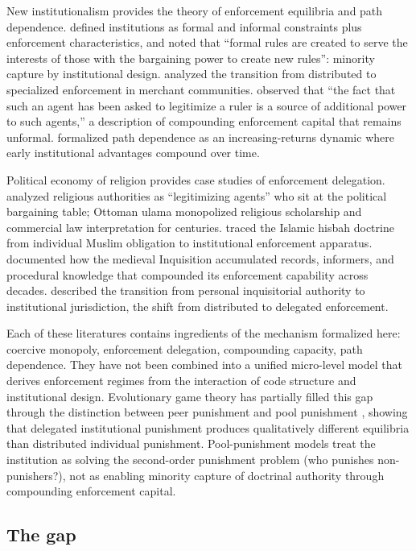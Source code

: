 \documentclass[12pt]{article}
\begin{document}
New institutionalism provides the theory of enforcement equilibria and path dependence. \citet{north1990} defined institutions as formal and informal constraints plus enforcement characteristics, and noted that ``formal rules are created to serve the interests of those with the bargaining power to create new rules'': minority capture by institutional design. \citet{greif2006} analyzed the transition from distributed to specialized enforcement in merchant communities. \citet{greif2016} observed that ``the fact that such an agent has been asked to legitimize a ruler is a source of additional power to such agents,'' a description of compounding enforcement capital that remains unformal. \citet{pierson2000} formalized path dependence as an increasing-returns dynamic where early institutional advantages compound over time.

Political economy of religion provides case studies of enforcement delegation. \citet{rubin2017} analyzed religious authorities as ``legitimizing agents'' who sit at the political bargaining table; Ottoman ulama monopolized religious scholarship and commercial law interpretation for centuries. \citet{cook2000} traced the Islamic hisbah doctrine from individual Muslim obligation to institutional enforcement apparatus. \citet{given1997} documented how the medieval Inquisition accumulated records, informers, and procedural knowledge that compounded its enforcement capability across decades. \citet{kelly1989} described the transition from personal inquisitorial authority to institutional jurisdiction, the shift from distributed to delegated enforcement.

Each of these literatures contains ingredients of the mechanism formalized here: coercive monopoly, enforcement delegation, compounding capacity, path dependence. They have not been combined into a unified micro-level model that derives enforcement regimes from the interaction of code structure and institutional design. Evolutionary game theory has partially filled this gap through the distinction between peer punishment and pool punishment \citep{hilbe2014,sigmund2010}, showing that delegated institutional punishment produces qualitatively different equilibria than distributed individual punishment. Pool-punishment models treat the institution as solving the second-order punishment problem (who punishes non-punishers?), not as enabling minority capture of doctrinal authority through compounding enforcement capital.

\subsection{The gap}
\end{document}
